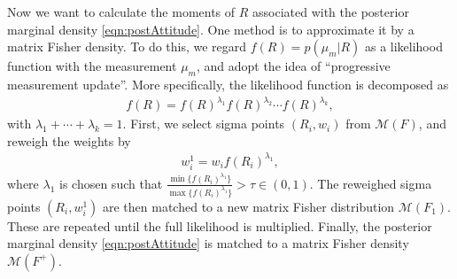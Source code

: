 \documentclass[10pt]{article}
\begin{document}
Now we want to calculate the moments of $R$ associated with the posterior marginal density \eqref{eqn:postAttitude}.
One method is to approximate it by a matrix Fisher density.
To do this, we regard $f(R) = p(\mu_m | R)$ as a likelihood function with the measurement $\mu_m$, and adopt the idea of ``progressive measurement update''.
More specifically, the likelihood function is decomposed as
\begin{align}
	f(R) = f(R)^{\lambda_1} f(R)^{\lambda_2} \cdots f(R)^{\lambda_k},
\end{align}
with $\lambda_1 + \cdots + \lambda_k = 1$.
First, we select sigma points $(R_i,w_i)$ from $\mathcal{M}(F)$, and reweigh the weights by
\begin{align}
	w_i^1 = w_i f(R_i)^{\lambda_1},
\end{align}
where $\lambda_1$ is chosen such that $\frac{\min\{f(R_i)^{\lambda_1}\}}{\max\{f(R_i)^{\lambda_1}\}} > \tau \in (0,1)$.
The reweighed sigma points $(R_i,w_i^1)$ are then matched to a new matrix Fisher distribution $\mathcal{M}(F_1)$.
These are repeated until the full likelihood is multiplied.
Finally, the posterior marginal density \eqref{eqn:postAttitude} is matched to a matrix Fisher density $\mathcal{M}(F^+)$.
\end{document}
